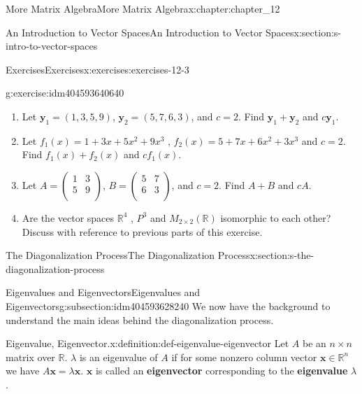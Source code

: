 \documentclass[twoside,10pt,]{book}
\newcommand{\terminology}[1]{\textbf{#1}}
\numberwithin{equation}{section}
\renewcommand{\vec}[1]{\mathbf{#1}}
\begin{document}
\begin{chapterptx}{More Matrix Algebra}{}{More Matrix Algebra}{}{}{x:chapter:chapter_12}
\begin{sectionptx}{An Introduction to Vector Spaces}{}{An Introduction to Vector Spaces}{}{}{x:section:s-intro-to-vector-spaces}
\begin{exercises-subsection}{Exercises}{}{Exercises}{}{}{x:exercises:exercises-12-3}
\begin{divisionexercise}{13}{}{}{g:exercise:idm404593640640}
%
\begin{enumerate}[label=(\alph*)]
\item{}Let \(\vec{y}_1= (1,3, 5, 9)\),  \(\vec{y}_2= (5,7, 6, 3)\), and \(c = 2\).  Find \(\vec{y}_1+\vec{y}_2\) and \(c \vec{y}_1\).%
\item{}Let  \(f_1(x) = 1 + 3x + 5x^2 + 9x^3\) , \(f_2(x)=5 + 7x+6x^2+3x^3\) and \(c = 2\). Find \(f_1(x)+f_2(x)\) and \(c f_1(x)\).%
\item{}Let \(A =\left(
\begin{array}{cc}
1 & 3 \\
5 & 9 \\
\end{array}
\right)\), \(B=\left(
\begin{array}{cc}
5 & 7 \\
6 & 3 \\
\end{array}
\right)\), and \(c=2\). Find \(A + B\) and \(c A\).%
\item{}Are the vector spaces \(\mathbb{R}^4\) , \(P^3\) and \(M_{2\times 2}(\mathbb{R})\) isomorphic to each other? Discuss with reference to previous parts of this exercise.%
\end{enumerate}
%
\end{divisionexercise}%
\end{exercises-subsection}
\end{sectionptx}
%
%
\typeout{************************************************}
\typeout{************************************************}
%
\begin{sectionptx}{The Diagonalization Process}{}{The Diagonalization Process}{}{}{x:section:s-the-diagonalization-process}
%
%
%
\typeout{************************************************}
\typeout{************************************************}
%
\begin{subsectionptx}{Eigenvalues and Eigenvectors}{}{Eigenvalues and Eigenvectors}{}{}{g:subsection:idm404593628240}
We now have the background to understand the main ideas behind the diagonalization process.%
\begin{definition}{Eigenvalue, Eigenvector.}{x:definition:def-eigenvalue-eigenvector}%
%
%
Let \(A\) be an \(n\times n\) matrix over \(\mathbb{R}\).  \(\lambda\)  is an eigenvalue of \(A\) if for some nonzero column vector  \(\vec{x}\in \mathbb{R}^n\) we have \(A \vec{x} = \lambda  \vec{x}\).  \(\vec{x}\) is called an \terminology{eigenvector} corresponding to the \terminology{eigenvalue} \(\lambda\).%

\end{definition}
\end{subsectionptx}
\end{sectionptx}
\end{chapterptx}
\end{document}
